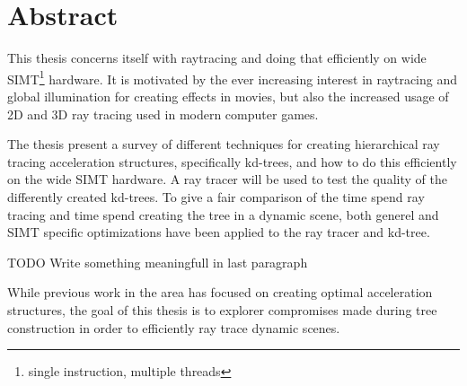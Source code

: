 

\section*{Abstract}

This thesis concerns itself with raytracing and doing that efficiently
on wide SIMT\footnote{single instruction, multiple threads}
hardware. It is motivated by the ever increasing interest in
raytracing and global illumination for creating effects in movies, but
also the increased usage of 2D and 3D ray tracing used in modern
computer games.

The thesis present a survey of different techniques for creating
hierarchical ray tracing acceleration structures, specifically
kd-trees, and how to do this efficiently on the wide SIMT hardware. A
ray tracer will be used to test the quality of the differently created
kd-trees. To give a fair comparison of the time spend ray tracing and
time spend creating the tree in a dynamic scene, both generel and SIMT
specific optimizations have been applied to the ray tracer and
kd-tree.

TODO Write something meaningfull in last paragraph

While previous work in the area has focused on creating optimal
acceleration structures, the goal of this thesis is to explorer
compromises made during tree construction in order to efficiently ray
trace dynamic scenes.











